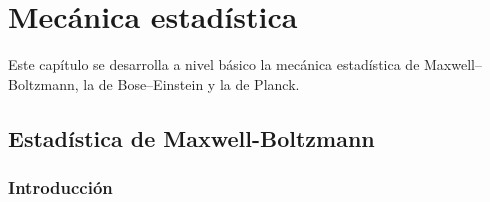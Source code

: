 %

\chapter{Mecánica estadística}
Este capítulo se desarrolla a nivel básico la mecánica estadística
de Maxwell--Boltzmann, la de Bose--Einstein y la de Planck.

\section{Estadística de Maxwell-Boltzmann}

\subsection{Introducción}





